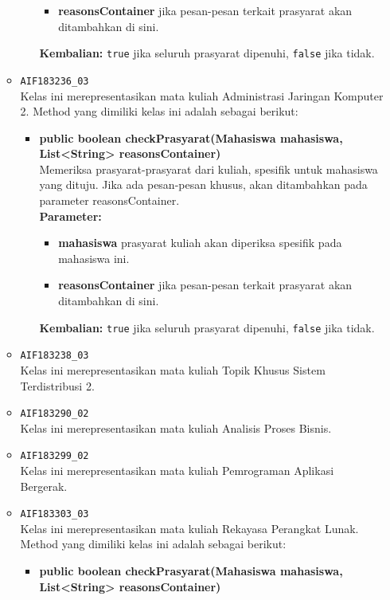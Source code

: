 \begin{enumerate}
\begin{itemize}
\begin{itemize}
\begin{itemize}
				\item \textbf{reasonsContainer} jika pesan-pesan terkait prasyarat akan ditambahkan di sini.
			\end{itemize}
			\textbf{Kembalian:} \texttt{true} jika seluruh prasyarat dipenuhi, \texttt{false} jika tidak.
		\end{itemize}
		\item \texttt{AIF183236\_03} \\
		Kelas ini merepresentasikan mata kuliah Administrasi Jaringan Komputer 2. Method yang dimiliki kelas ini adalah sebagai berikut: 
		\begin{itemize}
			\item \textbf{public boolean checkPrasyarat(Mahasiswa mahasiswa, List<String> reasonsContainer)}\\
			Memeriksa prasyarat-prasyarat dari kuliah, spesifik untuk mahasiswa yang dituju. Jika ada pesan-pesan khusus, akan ditambahkan pada parameter reasonsContainer.\\
			\textbf{Parameter:}
			\begin{itemize}
				\item \textbf{mahasiswa} prasyarat kuliah akan diperiksa spesifik pada mahasiswa ini.
				\item \textbf{reasonsContainer} jika pesan-pesan terkait prasyarat akan ditambahkan di sini.
			\end{itemize}
			\textbf{Kembalian:} \texttt{true} jika seluruh prasyarat dipenuhi, \texttt{false} jika tidak.
		\end{itemize}
		\item \texttt{AIF183238\_03} \\
		Kelas ini merepresentasikan mata kuliah Topik Khusus Sistem Terdistribusi 2.
		\item \texttt{AIF183290\_02} \\
		Kelas ini merepresentasikan mata kuliah Analisis Proses Bisnis.
		\item \texttt{AIF183299\_02} \\
		Kelas ini merepresentasikan mata kuliah Pemrograman Aplikasi Bergerak.
		\item \texttt{AIF183303\_03} \\
		Kelas ini merepresentasikan mata kuliah Rekayasa Perangkat Lunak. Method yang dimiliki kelas ini adalah sebagai berikut: 
		\begin{itemize}
			\item \textbf{public boolean checkPrasyarat(Mahasiswa mahasiswa, List<String> reasonsContainer)}\\

\end{itemize}
\end{itemize}
\end{enumerate}
